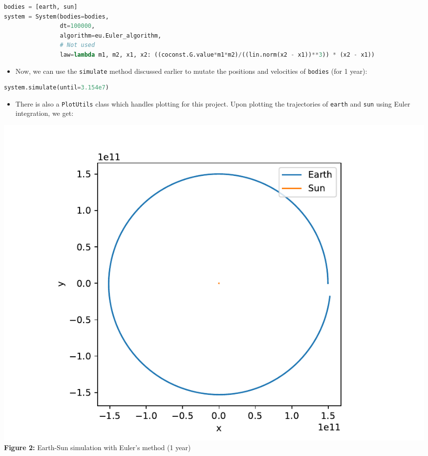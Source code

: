 \documentclass[11pt]{article}
\begin{document}
    \begin{lstlisting}[language=Python, caption=Earth-Sun system]
bodies = [earth, sun]
system = System(bodies=bodies,
                dt=100000,
                algorithm=eu.Euler_algorithm,
                # Not used
                law=lambda m1, m2, x1, x2: ((coconst.G.value*m1*m2)/((lin.norm(x2 - x1))**3)) * (x2 - x1))
    \end{lstlisting}

    \begin{itemize}
        \item Now, we can use the \texttt{simulate} method discussed earlier to mutate the positions and velocities of \texttt{bodies} (for 1 year):
    \end{itemize}
    \begin{lstlisting}[language=Python, caption=Simulate the system for a year]
system.simulate(until=3.154e7)
    \end{lstlisting}
    \begin{itemize}
        \item There is also a \texttt{PlotUtils} class which handles plotting for this project. Upon plotting the trajectories of \texttt{earth} and \texttt{sun} using Euler integration, we get:
    \end{itemize}

    \begin{center}
        \includegraphics[scale = 1]{images/euler_earth_sun}
        \\ \caption{\textbf{Figure 2:} Earth-Sun simulation with Euler's method (1 year)}
        \label{fig:fig2}
    \end{center}
\end{document}
